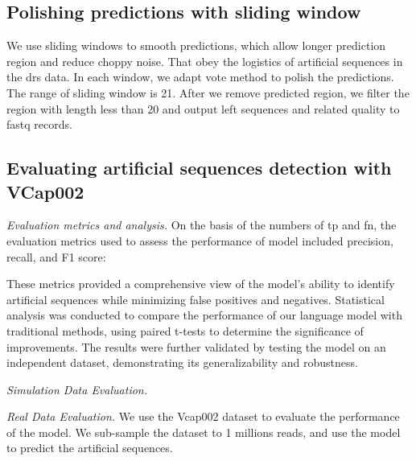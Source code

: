 \documentclass[pdflatex, sn-mathphys-num, lineno]{sn-jnl}%
\theoremstyle{thmstyleone}%
\theoremstyle{thmstyletwo}%
\theoremstyle{thmstylethree}%
\begin{document}
\subsection{Polishing predictions with sliding window}

We use sliding windows to smooth predictions, which allow longer prediction region and reduce choppy noise.
That obey the logistics of artificial sequences in the \gls{drs} data.
In each window, we adapt vote method to polish the predictions.
The range of sliding window is \num{21}.
After we remove predicted region, we filter the region with length less than \num{20} and output left sequences and related quality to fastq records.

\subsection{Evaluating artificial sequences detection with VCap002}

\textit{Evaluation metrics and analysis.} On the basis of the numbers of \gls{tp} and \gls{fn}, the evaluation metrics used to assess the performance of  model included precision, recall, and F1 score:

These metrics provided a comprehensive view of the model's ability to identify artificial sequences while minimizing false positives and negatives.
Statistical analysis was conducted to compare the performance of our language model with traditional methods, using paired t-tests to determine the significance of improvements.
The results were further validated by testing the model on an independent dataset, demonstrating its generalizability and robustness.

\textit{Simulation Data Evaluation.}

\textit{Real Data Evaluation.} We use the Vcap002 dataset to evaluate the performance of the model.
We sub-sample the dataset to 1 millions reads, and use the model to predict the artificial sequences.


\end{document}
